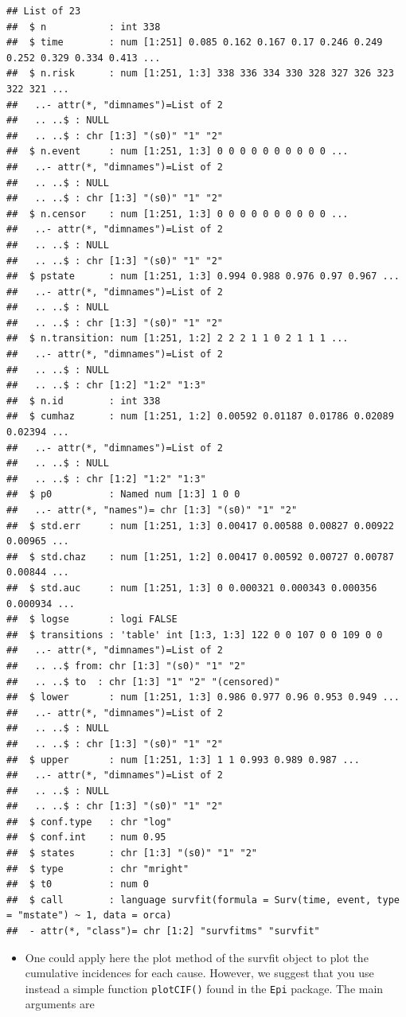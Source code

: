 \documentclass[
]{book}
\providecommand{\tightlist}{%
  \setlength{\itemsep}{0pt}\setlength{\parskip}{0pt}}
\theoremstyle{definition}
\theoremstyle{definition}
\theoremstyle{definition}
\theoremstyle{definition}
\theoremstyle{remark}
\begin{document}
\begin{verbatim}
## List of 23
##  $ n           : int 338
##  $ time        : num [1:251] 0.085 0.162 0.167 0.17 0.246 0.249 0.252 0.329 0.334 0.413 ...
##  $ n.risk      : num [1:251, 1:3] 338 336 334 330 328 327 326 323 322 321 ...
##   ..- attr(*, "dimnames")=List of 2
##   .. ..$ : NULL
##   .. ..$ : chr [1:3] "(s0)" "1" "2"
##  $ n.event     : num [1:251, 1:3] 0 0 0 0 0 0 0 0 0 0 ...
##   ..- attr(*, "dimnames")=List of 2
##   .. ..$ : NULL
##   .. ..$ : chr [1:3] "(s0)" "1" "2"
##  $ n.censor    : num [1:251, 1:3] 0 0 0 0 0 0 0 0 0 0 ...
##   ..- attr(*, "dimnames")=List of 2
##   .. ..$ : NULL
##   .. ..$ : chr [1:3] "(s0)" "1" "2"
##  $ pstate      : num [1:251, 1:3] 0.994 0.988 0.976 0.97 0.967 ...
##   ..- attr(*, "dimnames")=List of 2
##   .. ..$ : NULL
##   .. ..$ : chr [1:3] "(s0)" "1" "2"
##  $ n.transition: num [1:251, 1:2] 2 2 2 1 1 0 2 1 1 1 ...
##   ..- attr(*, "dimnames")=List of 2
##   .. ..$ : NULL
##   .. ..$ : chr [1:2] "1:2" "1:3"
##  $ n.id        : int 338
##  $ cumhaz      : num [1:251, 1:2] 0.00592 0.01187 0.01786 0.02089 0.02394 ...
##   ..- attr(*, "dimnames")=List of 2
##   .. ..$ : NULL
##   .. ..$ : chr [1:2] "1:2" "1:3"
##  $ p0          : Named num [1:3] 1 0 0
##   ..- attr(*, "names")= chr [1:3] "(s0)" "1" "2"
##  $ std.err     : num [1:251, 1:3] 0.00417 0.00588 0.00827 0.00922 0.00965 ...
##  $ std.chaz    : num [1:251, 1:2] 0.00417 0.00592 0.00727 0.00787 0.00844 ...
##  $ std.auc     : num [1:251, 1:3] 0 0.000321 0.000343 0.000356 0.000934 ...
##  $ logse       : logi FALSE
##  $ transitions : 'table' int [1:3, 1:3] 122 0 0 107 0 0 109 0 0
##   ..- attr(*, "dimnames")=List of 2
##   .. ..$ from: chr [1:3] "(s0)" "1" "2"
##   .. ..$ to  : chr [1:3] "1" "2" "(censored)"
##  $ lower       : num [1:251, 1:3] 0.986 0.977 0.96 0.953 0.949 ...
##   ..- attr(*, "dimnames")=List of 2
##   .. ..$ : NULL
##   .. ..$ : chr [1:3] "(s0)" "1" "2"
##  $ upper       : num [1:251, 1:3] 1 1 0.993 0.989 0.987 ...
##   ..- attr(*, "dimnames")=List of 2
##   .. ..$ : NULL
##   .. ..$ : chr [1:3] "(s0)" "1" "2"
##  $ conf.type   : chr "log"
##  $ conf.int    : num 0.95
##  $ states      : chr [1:3] "(s0)" "1" "2"
##  $ type        : chr "mright"
##  $ t0          : num 0
##  $ call        : language survfit(formula = Surv(time, event, type = "mstate") ~ 1, data = orca)
##  - attr(*, "class")= chr [1:2] "survfitms" "survfit"
\end{verbatim}

\begin{itemize}
\tightlist
\item
  One could apply here the plot method of the survfit object to plot the
  cumulative incidences for each cause. However, we suggest that you use
  instead a simple function \texttt{plotCIF()} found in the \texttt{Epi} package. The
  main arguments are
\end{itemize}
\end{document}
